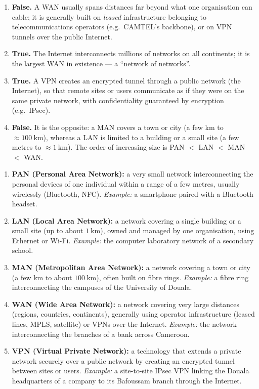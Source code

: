 \documentclass[11pt]{article}
\newcommand{\cle}[1]{{\popxbold\color{popdark}#1}}
\begin{document}
\begin{corrige}
\begin{enumerate}
\item \textbf{False.} A WAN usually spans distances far beyond what one organisation can cable; it is generally built on \emph{leased} infrastructure belonging to telecommunications operators (e.g.\ CAMTEL's backbone), or on VPN tunnels over the public Internet.
\item \textbf{True.} The Internet interconnects millions of networks on all continents; it is the largest WAN in existence — a ``network of networks''.
\item \textbf{True.} A \cle{VPN} creates an encrypted tunnel through a public network (the Internet), so that remote sites or users communicate as if they were on the same private network, with confidentiality guaranteed by encryption (e.g.\ IPsec).
\item \textbf{False.} It is the opposite: a MAN covers a town or city (a few km to $\approx 100\ \mathrm{km}$), whereas a LAN is limited to a building or a small site (a few metres to $\approx 1\ \mathrm{km}$). The order of increasing size is PAN $<$ LAN $<$ MAN $<$ WAN.
\end{enumerate}
\end{corrige}

\begin{corrige}
\begin{enumerate}
\item \textbf{PAN (Personal Area Network):} a very small network interconnecting the personal devices of one individual within a range of a few metres, usually wirelessly (Bluetooth, NFC). \emph{Example:} a smartphone paired with a Bluetooth headset.
\item \textbf{LAN (Local Area Network):} a network covering a single building or a small site (up to about $1\ \mathrm{km}$), owned and managed by one organisation, using Ethernet or Wi-Fi. \emph{Example:} the computer laboratory network of a secondary school.
\item \textbf{MAN (Metropolitan Area Network):} a network covering a town or city (a few km to about $100\ \mathrm{km}$), often built on fibre rings. \emph{Example:} a fibre ring interconnecting the campuses of the University of Douala.
\item \textbf{WAN (Wide Area Network):} a network covering very large distances (regions, countries, continents), generally using operator infrastructure (leased lines, MPLS, satellite) or VPNs over the Internet. \emph{Example:} the network interconnecting the branches of a bank across Cameroon.
\item \textbf{VPN (Virtual Private Network):} a technology that extends a private network securely over a public network by creating an encrypted tunnel between sites or users. \emph{Example:} a site-to-site IPsec VPN linking the Douala headquarters of a company to its Bafoussam branch through the Internet.
\end{enumerate}
\end{corrige}
\end{document}
